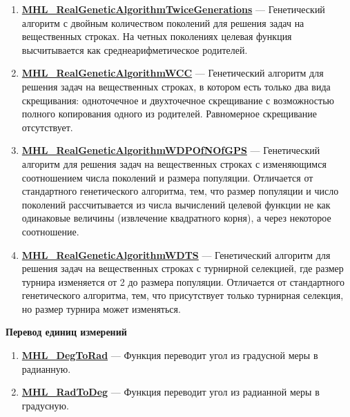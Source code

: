 \documentclass[a4paper,12pt]{article}
\begin{document}
\begin{enumerate}
\item \textbf{\hyperref[MHL_RealGeneticAlgorithmTwiceGenerations]{MHL\_RealGeneticAlgorithmTwiceGenerations}} --- Генетический алгоритм с двойным количеством поколений для решения задач на вещественных строках. На четных поколениях целевая функция высчитывается как среднеарифметическое родителей.

\item \textbf{\hyperref[MHL_RealGeneticAlgorithmWCC]{MHL\_RealGeneticAlgorithmWCC}} --- Генетический алгоритм для решения задач на вещественных строках, в котором есть только два вида скрещивания: одноточечное и двухточечное скрещивание с возможностью полного копирования одного из родителей. Равномерное скрещивание отсутствует.

\item \textbf{\hyperref[MHL_RealGeneticAlgorithmWDPOfNOfGPS]{MHL\_RealGeneticAlgorithmWDPOfNOfGPS}} --- Генетический алгоритм для решения задач на вещественных строках с изменяющимся соотношением числа поколений и размера популяции. Отличается от стандартного генетического алгоритма, тем, что размер популяции и число поколений рассчитывается из числа вычислений целевой функции не как одинаковые величины (извлечение квадратного корня), а через некоторое соотношение.

\item \textbf{\hyperref[MHL_RealGeneticAlgorithmWDTS]{MHL\_RealGeneticAlgorithmWDTS}} --- Генетический алгоритм для решения задач на вещественных строках  с турнирной селекцией, где размер турнира изменяется от 2 до размера популяции.
Отличается от стандартного генетического алгоритма, тем, что присутствует только турнирная селекция, но размер турнира может изменяться.

\end{enumerate}

\textbf{Перевод единиц измерений}
\begin{enumerate}

\item \textbf{\hyperref[MHL_DegToRad]{MHL\_DegToRad}} --- Функция переводит угол из градусной меры в радианную.

\item \textbf{\hyperref[MHL_RadToDeg]{MHL\_RadToDeg}} --- Функция переводит угол из радианной меры в градусную.

\end{enumerate}
\end{document}
